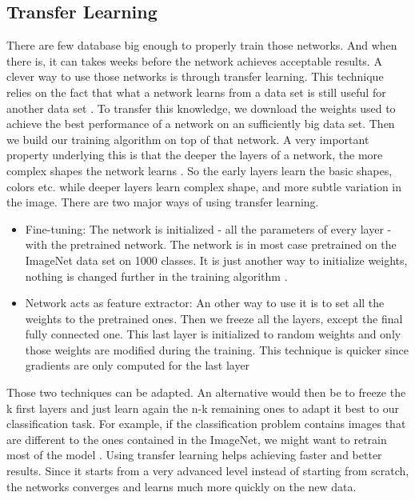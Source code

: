 \subsection{Transfer Learning} \label{sec:translearn}
There are few database big enough to properly train those networks. And when there is, it can takes weeks before the network achieves acceptable results. A clever way to use those networks is through transfer learning. This technique relies on the fact that what a network learns from a data set is still useful for another data set \cite{translearnsurvey}. To transfer this knowledge,  we download the weights used to achieve the best performance of a network on an sufficiently big data set. Then we build our training algorithm on top of that network. A very important property underlying this is that the deeper the layers of a network, the more complex shapes the network learns \cite{layerslearn}. So the early layers learn the basic shapes, colors etc. while deeper layers learn complex shape, and more subtle variation in the image. 
There are two major ways of using transfer learning. 
\begin{itemize}
    \item Fine-tuning: The network is initialized - all the parameters of every layer - with the pretrained network. The network is in most case pretrained on the ImageNet data set on 1000 classes. It is just another way to initialize weights, nothing is changed further in the training algorithm \cite{cs231n}.
    \item Network acts as feature extractor: An other way to use it is to set all the weights to the pretrained ones. Then we freeze all the layers, except the final fully connected one. This last layer is initialized to random weights and only those weights are modified during the training. 
    This technique is quicker since gradients are only computed for the last layer
\end{itemize}
Those two techniques can be adapted.  An alternative would then be to freeze the k first layers and just learn again the n-k remaining ones to adapt it best to our classification task. For example, if the classification problem contains images that are  different to the ones contained in the ImageNet, we might want to retrain most of the model \cite{translearnsurvey}. 
Using transfer learning helps achieving faster and better results. Since it starts from a very advanced level instead of starting from scratch, the networks converges and learns much more quickly on the new data.

